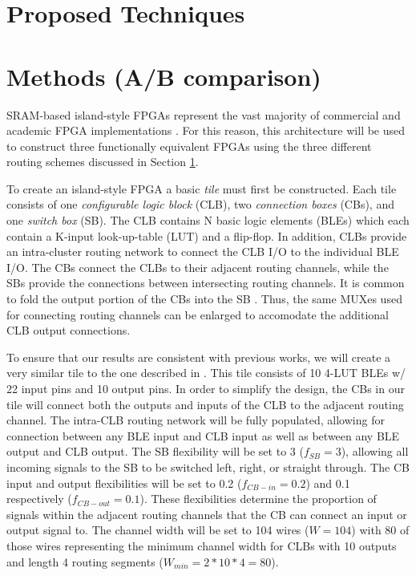 \documentclass[twoside,twocolumn]{article}
\begin{document}

\section{Proposed Techniques}\label{sec:proposed}




\section{Methods (A/B comparison)}
SRAM-based island-style FPGAs represent the vast majority of commercial and academic
FPGA implementations \cite{farooq_fpga_2012}. For this reason, this architecture 
will be used to construct three functionally equivalent FPGAs using the three different
routing schemes discussed in Section \ref{sec:proposed}. 

To create an island-style FPGA a basic \textit{tile} must first be constructed. 
Each tile consists of one \textit{configurable logic block} (CLB), 
two \textit{connection boxes} (CBs), and one \textit{switch box} (SB). 
The CLB contains N basic logic elements (BLEs) which each contain a K-input 
look-up-table (LUT) and a flip-flop. In addition, CLBs provide an intra-cluster 
routing network to connect the CLB I/O to the individual BLE I/O. The CBs connect
the CLBs to their adjacent routing channels, while the SBs provide the connections
between intersecting routing channels. It is common to fold the output portion of 
the CBs into the SB \cite{chen_efficient_2010}. Thus, the same MUXes used for
connecting routing channels can be enlarged to accomodate the additional 
CLB output connections.

To ensure that our results are consistent with previous works, we
will create a very similar tile to the one described in \cite{chen_efficient_2010}. 
This tile consists of 10 4-LUT BLEs w/ 22 input pins and 10 output pins.
In order to simplify the design, the CBs in our tile will connect both
the outputs and inputs of the CLB to the adjacent routing channel.
The intra-CLB routing network will be fully populated, allowing for connection 
between any BLE input and CLB input as well as between any BLE output and CLB output.
The SB flexibility will be set to 3 ($f_{SB} = 3$), allowing all 
incoming signals to the SB to be switched left, right, or straight through. 
The CB input and output flexibilities will be set to 0.2 ($f_{CB-in} = 0.2$) 
and 0.1 respectively ($f_{CB-out} = 0.1$). These flexibilities determine the 
proportion of signals within the adjacent routing channels that the CB can 
connect an input or output signal to. The channel width will be set to 104 wires
($W=104$) with 80 of those wires representing the minimum channel width for 
CLBs with 10 outputs and length 4 routing segments ($W_{min} = 2 * 10 * 4 = 80$).
\end{document}
